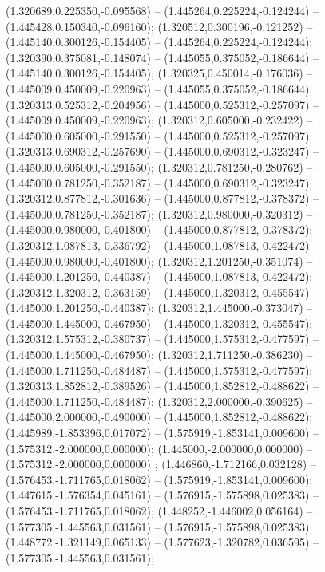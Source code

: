  (1.320689,0.225350,-0.095568) -- (1.445264,0.225224,-0.124244) -- (1.445428,0.150340,-0.096160);
 (1.320512,0.300196,-0.121252) -- (1.445140,0.300126,-0.154405) -- (1.445264,0.225224,-0.124244);
 (1.320390,0.375081,-0.148074) -- (1.445055,0.375052,-0.186644) -- (1.445140,0.300126,-0.154405);
 (1.320325,0.450014,-0.176036) -- (1.445009,0.450009,-0.220963) -- (1.445055,0.375052,-0.186644);
 (1.320313,0.525312,-0.204956) -- (1.445000,0.525312,-0.257097) -- (1.445009,0.450009,-0.220963);
 (1.320312,0.605000,-0.232422) -- (1.445000,0.605000,-0.291550) -- (1.445000,0.525312,-0.257097);
 (1.320313,0.690312,-0.257690) -- (1.445000,0.690312,-0.323247) -- (1.445000,0.605000,-0.291550);
 (1.320312,0.781250,-0.280762) -- (1.445000,0.781250,-0.352187) -- (1.445000,0.690312,-0.323247);
 (1.320312,0.877812,-0.301636) -- (1.445000,0.877812,-0.378372) -- (1.445000,0.781250,-0.352187);
 (1.320312,0.980000,-0.320312) -- (1.445000,0.980000,-0.401800) -- (1.445000,0.877812,-0.378372);
 (1.320312,1.087813,-0.336792) -- (1.445000,1.087813,-0.422472) -- (1.445000,0.980000,-0.401800);
 (1.320312,1.201250,-0.351074) -- (1.445000,1.201250,-0.440387) -- (1.445000,1.087813,-0.422472);
 (1.320312,1.320312,-0.363159) -- (1.445000,1.320312,-0.455547) -- (1.445000,1.201250,-0.440387);
 (1.320312,1.445000,-0.373047) -- (1.445000,1.445000,-0.467950) -- (1.445000,1.320312,-0.455547);
 (1.320312,1.575312,-0.380737) -- (1.445000,1.575312,-0.477597) -- (1.445000,1.445000,-0.467950);
 (1.320312,1.711250,-0.386230) -- (1.445000,1.711250,-0.484487) -- (1.445000,1.575312,-0.477597);
 (1.320313,1.852812,-0.389526) -- (1.445000,1.852812,-0.488622) -- (1.445000,1.711250,-0.484487);
 (1.320312,2.000000,-0.390625) -- (1.445000,2.000000,-0.490000) -- (1.445000,1.852812,-0.488622);
 (1.445989,-1.853396,0.017072) -- (1.575919,-1.853141,0.009600) -- (1.575312,-2.000000,0.000000);
 (1.445000,-2.000000,0.000000) -- (1.575312,-2.000000,0.000000) ;
 (1.446860,-1.712166,0.032128) -- (1.576453,-1.711765,0.018062) -- (1.575919,-1.853141,0.009600);
 (1.447615,-1.576354,0.045161) -- (1.576915,-1.575898,0.025383) -- (1.576453,-1.711765,0.018062);
 (1.448252,-1.446002,0.056164) -- (1.577305,-1.445563,0.031561) -- (1.576915,-1.575898,0.025383);
 (1.448772,-1.321149,0.065133) -- (1.577623,-1.320782,0.036595) -- (1.577305,-1.445563,0.031561);

